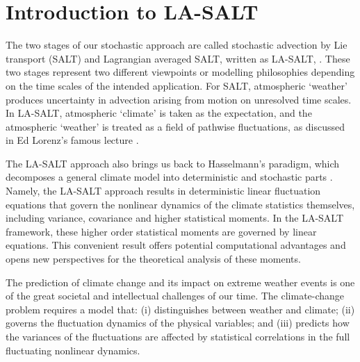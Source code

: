 \documentclass[11pt, oneside]{article}   	%
\numberwithin{equation}{section}
\theoremstyle{plain}
\theoremstyle{definition}
\theoremstyle{remark}
\newcommand{\<}{\langle}
\renewcommand{\>}{\rangle}
\begin{document}
\section{Introduction to LA-SALT}
The two stages of our stochastic approach are called stochastic advection by Lie transport
(SALT) \cite{Holm2015} and Lagrangian averaged SALT, written as LA-SALT, \cite{DrivasHolm2019,DrivasHolmLeahy2020}. These two stages represent
two different viewpoints or modelling philosophies depending on the time scales of the intended application. 
For SALT, atmospheric `weather' produces uncertainty in advection arising
from motion on unresolved time scales. In LA-SALT, atmospheric `climate' is taken as the
expectation, and the atmospheric `weather' is treated as a field of pathwise fluctuations, as discussed in Ed Lorenz's famous lecture \cite{Lorenz1995}. 
 

The LA-SALT approach also brings us back to Hasselmann's paradigm, which decomposes a general climate model into deterministic 
and stochastic parts \cite{hasselmann1976stochastic}. Namely, the LA-SALT approach
results in deterministic linear fluctuation equations that govern the nonlinear dynamics of the climate
statistics themselves, including variance, covariance and higher statistical moments. In 
the LA-SALT framework, these higher order statistical moments are governed by linear equations. This
convenient result offers potential computational advantages and opens new perspectives for the theoretical
analysis of these moments.

The prediction of climate change and its impact on extreme weather events is one of the great societal and intellectual challenges of our time. 
The climate-change problem requires a model that:  (i) distinguishes between weather and climate; (ii) governs the fluctuation dynamics 
of the physical variables; and (iii) predicts how the variances of the fluctuations are affected by statistical correlations in the full fluctuating nonlinear dynamics. 
\end{document}
